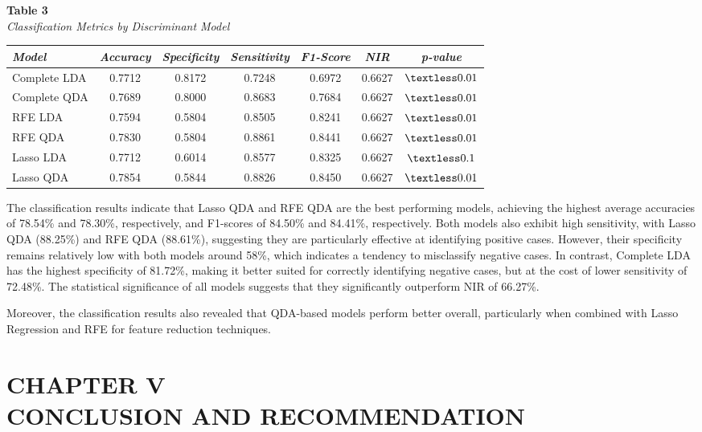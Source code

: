\documentclass[12pt]{article}
\begin{document}
\newpage
\noindent
\textbf{Table 3}\\
\textit{Classification Metrics by Discriminant Model}
\begin{center}
    \begin{tabular}{lcccccc}
        \hline
        \textit{Model} & \textit{Accuracy} & \textit{Specificity} & \textit{Sensitivity} & \textit{F1-Score} & \textit{NIR} & \textit{p-value} \\
        \hline
        Complete LDA & 0.7712 & 0.8172 & 0.7248 & 0.6972 & 0.6627 & \(\textless 0.01\) \\
        Complete QDA & 0.7689 & 0.8000 & 0.8683 & 0.7684 & 0.6627 & \(\textless 0.01\) \\
        RFE LDA & 0.7594 & 0.5804 & 0.8505 & 0.8241 & 0.6627 & \(\textless 0.01\) \\
        RFE QDA & 0.7830 & 0.5804 & 0.8861 & 0.8441 & 0.6627 & \(\textless 0.01\) \\
        Lasso LDA & 0.7712 & 0.6014 & 0.8577 & 0.8325 & 0.6627 & \(\textless 0.1\) \\ 
        Lasso QDA & 0.7854 & 0.5844 & 0.8826 & 0.8450 & 0.6627 & \(\textless 0.01\) \\
        \hline
    \end{tabular}
\end{center}

The classification results indicate that Lasso QDA and RFE QDA are the best performing models, achieving the highest average accuracies of 78.54\% and 78.30\%, respectively, and F1-scores of 
84.50\% and 84.41\%, respectively. Both models also exhibit high sensitivity, with Lasso QDA (88.25\%) and RFE QDA (88.61\%), suggesting they are particularly effective at identifying positive cases. 
However, their specificity remains relatively low with both models around 58\%, which indicates a tendency to misclassify negative cases. In contrast, Complete LDA has the highest specificity of 81.72\%, making 
it better suited for correctly identifying negative cases, but at the cost of lower sensitivity of 72.48\%. The statistical significance of all models suggests that they significantly outperform NIR of 66.27\%. 

Moreover, the classification results also revealed that QDA-based models perform better overall, particularly when combined with Lasso Regression and RFE for feature reduction techniques. 


\newpage
\section{CHAPTER V \\ CONCLUSION AND RECOMMENDATION}
\noindent 
\end{document}
